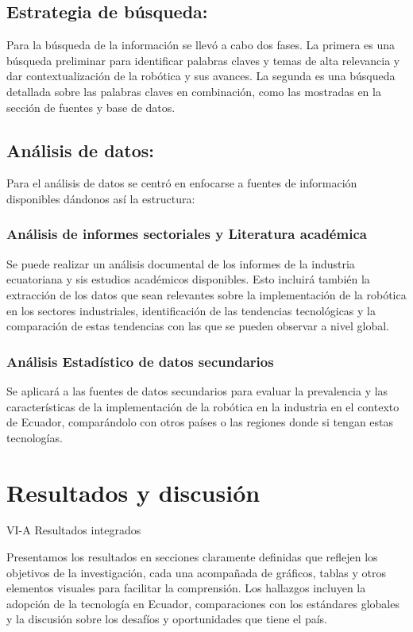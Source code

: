 \documentclass[conference]{IEEEtran}
\begin{document}
\subsection{Estrategia de búsqueda:}

Para la búsqueda de la información se llevó a cabo dos fases. La primera es una búsqueda preliminar para identificar palabras claves y temas de alta relevancia y dar contextualización de la robótica y sus avances. La segunda es una búsqueda detallada sobre las palabras claves en combinación, como las mostradas en la sección de fuentes y base de datos.

\subsection{Análisis de datos:}

Para el análisis de datos se centró en enfocarse a fuentes de información disponibles dándonos así la estructura:


\subsubsection{Análisis de informes sectoriales y Literatura académica}

Se puede realizar un análisis documental de los informes de la industria ecuatoriana y sis estudios académicos disponibles. Esto incluirá también la extracción de los datos que sean relevantes sobre la implementación de la robótica en los sectores industriales, identificación de las tendencias tecnológicas y la comparación de estas tendencias con las que se pueden observar a nivel global.


\subsubsection{Análisis Estadístico de datos secundarios}

Se aplicará a las fuentes de datos secundarios para evaluar la prevalencia y las características de la implementación de la robótica en la industria en el contexto de Ecuador, comparándolo con otros países o las regiones donde si tengan estas tecnologías.

\section{Resultados y discusión}

VI-A Resultados integrados

Presentamos los resultados en secciones claramente definidas que reflejen los objetivos de la investigación, cada una acompañada de gráficos, tablas y otros elementos visuales para facilitar la comprensión. Los hallazgos incluyen la adopción de la tecnología en Ecuador, comparaciones con los estándares globales y la discusión sobre los desafíos y oportunidades que tiene el país.
\end{document}

